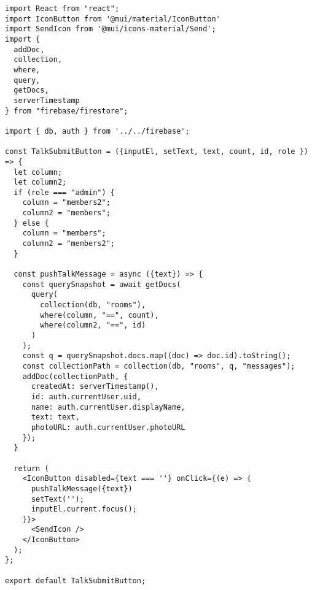 \begin{verbatim}
import React from "react";
import IconButton from '@mui/material/IconButton'
import SendIcon from '@mui/icons-material/Send';
import {
  addDoc,
  collection,
  where,
  query,
  getDocs,
  serverTimestamp
} from "firebase/firestore";

import { db, auth } from '../../firebase';

const TalkSubmitButton = ({inputEl, setText, text, count, id, role }) => {
  let column;
  let column2;
  if (role === "admin") {
    column = "members2";
    column2 = "members";
  } else {
    column = "members";
    column2 = "members2";
  }

  const pushTalkMessage = async ({text}) => {
    const querySnapshot = await getDocs(
      query(
        collection(db, "rooms"),
        where(column, "==", count),
        where(column2, "==", id)
      )
    );
    const q = querySnapshot.docs.map((doc) => doc.id).toString();
    const collectionPath = collection(db, "rooms", q, "messages");
    addDoc(collectionPath, {
      createdAt: serverTimestamp(),
      id: auth.currentUser.uid,
      name: auth.currentUser.displayName,
      text: text,
      photoURL: auth.currentUser.photoURL
    });
  }

  return (
    <IconButton disabled={text === ''} onClick={(e) => {
      pushTalkMessage({text})
      setText('');
      inputEl.current.focus();
    }}>
      <SendIcon />
    </IconButton>
  );
};

export default TalkSubmitButton;
\end{verbatim}